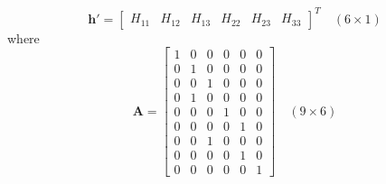 \documentclass[11pt]{article} %
\begin{document}
\begin{equation}
	\mathbf{h}' =  \left[ \begin{array}{cccccc} H_{11} & H_{12} & H_{13} & H_{22} & H_{23} & H_{33} \end{array} \right]^T \quad (6 \times 1)
\end{equation}
where
\begin{equation}
	\mathbf{A} =  \left[ \begin{array}{cccccc} 1 & 0 & 0 & 0 & 0 & 0 \\ 0 & 1 & 0 & 0 & 0 & 0 \\ 0 & 0 & 1 & 0 & 0 & 0 \\ 0 & 1 & 0 & 0 & 0 & 0 \\ 0 & 0 & 0 & 1 & 0 & 0 \\ 0 & 0 & 0 & 0 & 1 & 0 \\ 0 & 0 & 1 & 0 & 0 & 0 \\ 0 & 0 & 0 & 0 & 1 & 0 \\ 0 & 0 & 0 & 0 & 0 & 1 \end{array} \right] \quad (9 \times 6)
\end{equation}
\end{document}
